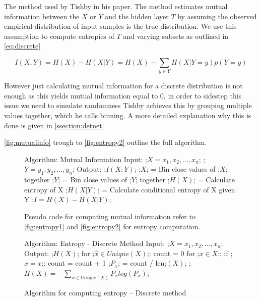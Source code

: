\documentclass[dissertation.tex]{subfiles}
\begin{document}
  The method used by Tishby in his paper. The method estimates mutual
  information between the $X$ or $Y$ and the hidden layer $T$ by assuming the
  observed empirical distribution of input samples is the true distribution. We
  use this assumption to compute entropies of $T$ and varying subsets as
  outlined in \autoref{eq:discrete}

\begin{equation}
  I(X, Y) = H(X) - H(X|Y) = H(X) - \sum _{y\in Y} H(X|Y = y)p(Y = y)
\label{eq:discrete}
\end{equation} 


  However just calculating mutual information for a discrete distribution is not
  enough as this yields mutual information equal to 0, in order to sidestep this
  issue we need to simulate randomness Tishby achieves this by grouping multiple
  values together, which he calls binning. A more detailed explanation why this
  is done is given in \autoref{ssection:detnet}

   \autoref{fig:mutualinfo} trough to \autoref{fig:entropy2} outline the full
   algorithm.
\begin{figure}[H]
    \begin{pythonfigure}
      Algorithm: Mutual Information
      Input: 
      ;$X = x_1, x_2,...,x_n$;
      ;$Y = y_1, y_2,...,y_n$;
      Output: ;$I(X:Y)$;
      ;$X$; = Bin close values of ;$X$; together
      ;$Y$; = Bin close values of ;$Y$; together
      ;$H(X)$; = Calculate entropy of X
      ;$H(X|Y)$; = Calculate conditional entropy of X given Y
      ;$I = H(X) - H(X|Y)$;
    \end{pythonfigure}
    \caption{Pseudo code for computing mutual information refer to
    \autoref{fig:entropy1} and \autoref{fig:entropy2} for entropy computation.}
    \label{fig:mutualinfo}
\end{figure}

\begin{figure}[H]
    \begin{pythonfigure}
      Algorithm: Entropy - Discrete Method
      Input: ;$X = x_1, x_2,...,x_n$;
      Output: ;$H(X)$;
      for ;$ \hat{x}\in Unique(X)$;:
        count = 0       
        for ;$x \in X$;:
          if ;$\hat{x} = x$;:
            count = count + 1
        ;$P_x$; = count / len;$(X)$;
      ;$H(X) = - \sum _{x\in Unique(X)} P_x log(P_x)$; 
    \end{pythonfigure}
    \caption{Algorithm for computing entropy -- Discrete method}
    \label{fig:entropy1}
\end{figure} 
\end{document}
